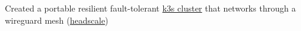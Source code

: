 {Created a portable resilient fault-tolerant \href{https://k3s.io/}{k3s cluster} that networks through a wireguard mesh (\href{https://github.com/juanfont/headscale}{headscale})}
